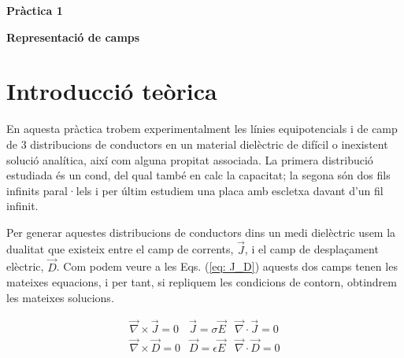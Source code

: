 \documentclass[11pt]{article}
\begin{document}
\tableofcontents
\newpage
\vspace{10em}

{\huge \textbf{Pràctica 1}}  %

\vspace{0.5em}  %

{\Huge \textbf{Representació de camps}}  %

\vspace{2em}  %


\begin{abstract}
    En aquesta pràctica estudiem les línies equipotencials i de camp de tres distribucions de condutors en un medi dielèctric assumint simetria en l'eix vertical. Un condensador plano-paral·lel, dos fils infinits i una geometria escollida entre els membres del grup que replica la disposició d'un experiment de difracció. Els resultats obtinguts són corroborats per simulacions computacionals i comparats amb els resultats del cas ideal dels que en difereix substancialment. També s'obté experimentalment la capacitat del condensador i es conclou que no difereix significativament del càlcul ideal.
\end{abstract}


\section{Introducció teòrica}\label{sec: intro}
En aquesta pràctica trobem experimentalment les línies equipotencials i de camp de 3 distribucions de conductors en un material dielèctric de difícil o inexistent solució analítica, així com alguna propitat associada. La primera distribució estudiada és un cond, del qual també en calc la capacitat; la segona són dos fils infinits paral·lels i per últim  estudiem una placa amb escletxa davant d'un fil infinit.

Per generar aquestes distribucions de conductors dins un medi dielèctric usem la dualitat que existeix entre el camp de corrents, $\vec{J}$, i el camp de desplaçament elèctric, $\vec{D}$. Com podem veure a les Eqs. (\ref{eq: J_D}) aquests dos camps tenen les mateixes equacions, i per tant, si repliquem les condicions de contorn, obtindrem les mateixes solucions.

\begin{equation}
    \begin{array}{lll}
    \vec{\nabla} \times \vec{J}=0 & \vec{J}=\sigma \vec{E} & \vec{\nabla} \cdot \vec{J}=0 \\
    \vec{\nabla} \times \vec{D}=0 & \vec{D}=\epsilon \vec{E} & \vec{\nabla} \cdot \vec{D}=0
    \end{array}
    \label{eq: J_D}
\end{equation}
\end{document}
